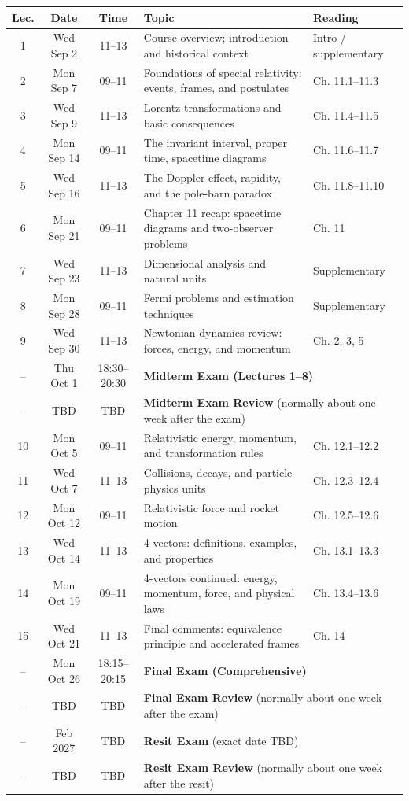 \documentclass[12pt]{article}
\begin{document}
\begin{longtable}{|c|c|c|p{5.8cm}|p{2.7cm}|}
\hline
\textbf{Lec.} & \textbf{Date} & \textbf{Time} & \textbf{Topic} & \textbf{Reading} \\ \hline
1 & Wed Sep 2 & 11--13 & Course overview; introduction and historical context & Intro / supplementary \\ \hline
2 & Mon Sep 7 & 09--11 & Foundations of special relativity: events, frames, and postulates & Ch. 11.1--11.3 \\ \hline
3 & Wed Sep 9 & 11--13 & Lorentz transformations and basic consequences & Ch. 11.4--11.5 \\ \hline
4 & Mon Sep 14 & 09--11 & The invariant interval, proper time, spacetime diagrams & Ch. 11.6--11.7 \\ \hline
5 & Wed Sep 16 & 11--13 & The Doppler effect, rapidity, and the pole-barn paradox & Ch. 11.8--11.10 \\ \hline
6 & Mon Sep 21 & 09--11 & Chapter 11 recap: spacetime diagrams and two-observer problems & Ch. 11 \\ \hline
7 & Wed Sep 23 & 11--13 & Dimensional analysis and natural units & Supplementary \\ \hline
8 & Mon Sep 28 & 09--11 & Fermi problems and estimation techniques & Supplementary \\ \hline
9 & Wed Sep 30 & 11--13 & Newtonian dynamics review: forces, energy, and momentum & Ch. 2, 3, 5 \\ \hline
-- & Thu Oct 1 & 18:30--20:30 & \multicolumn{2}{p{8.5cm}|}{\textbf{Midterm Exam (Lectures 1--8)}} \\ \hline
-- & TBD & TBD & \multicolumn{2}{p{8.5cm}|}{\textbf{Midterm Exam Review} (normally about one week after the exam)} \\ \hline
10 & Mon Oct 5 & 09--11 & Relativistic energy, momentum, and transformation rules &  Ch. 12.1--12.2 \\ \hline
11 & Wed Oct 7 & 11--13 & Collisions, decays, and particle-physics units & Ch. 12.3--12.4 \\ \hline
12 & Mon Oct 12 & 09--11 & Relativistic force and rocket motion & Ch. 12.5--12.6 \\ \hline
13 & Wed Oct 14 & 11--13 & 4-vectors: definitions, examples, and properties & Ch. 13.1--13.3 \\ \hline
14 & Mon Oct 19 & 09--11 & 4-vectors continued: energy, momentum, force, and physical laws & Ch. 13.4--13.6 \\ \hline
15 & Wed Oct 21 & 11--13 & Final comments: equivalence principle and accelerated frames & Ch. 14 \\ \hline
-- & Mon Oct 26 & 18:15--20:15 & \multicolumn{2}{p{8.5cm}|}{\textbf{Final Exam (Comprehensive)}} \\ \hline
-- & TBD & TBD & \multicolumn{2}{p{8.5cm}|}{\textbf{Final Exam Review} (normally about one week after the exam)} \\ \hline
-- & Feb 2027 & TBD & \multicolumn{2}{p{8.5cm}|}{\textbf{Resit Exam} (exact date TBD)} \\ \hline
-- & TBD & TBD & \multicolumn{2}{p{8.5cm}|}{\textbf{Resit Exam Review} (normally about one week after the resit)} \\ \hline
\end{longtable}
\end{document}
